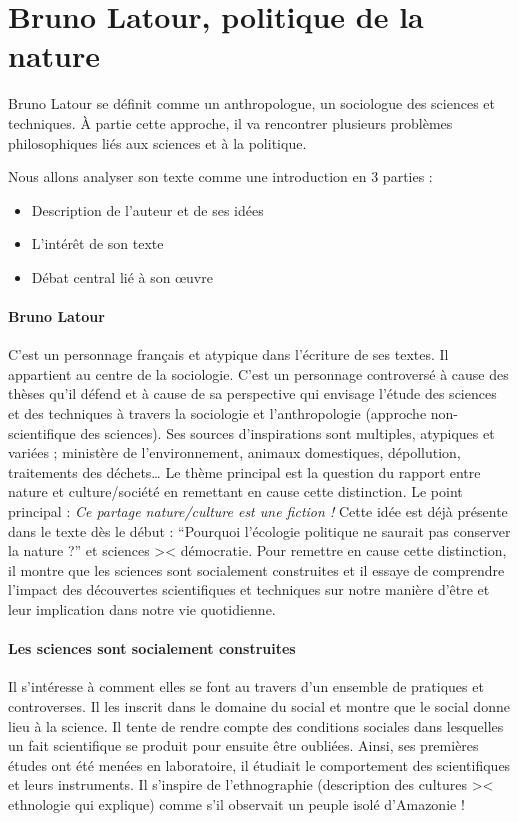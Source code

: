 \documentclass[11pt,a4paper]{article} %
\begin{document}
\part{Bruno Latour, politique de la nature}
Bruno Latour se définit comme un anthropologue, un sociologue des sciences et techniques.
À partie cette approche, il va rencontrer plusieurs problèmes philosophiques liés aux sciences et à la politique.

Nous allons analyser son texte comme une introduction en 3 parties :
\begin{itemize}
	\item Description de l'auteur et de ses idées
	\item L'intérêt de son texte
	\item Débat central lié à son œuvre
\end{itemize}

\subsection{Bruno Latour}
C'est un personnage français et atypique dans l'écriture de ses textes.
Il appartient au centre de la sociologie.
C'est un personnage controversé à cause des thèses qu'il défend et à cause de sa perspective qui envisage l'étude des sciences et des techniques à travers la sociologie et l'anthropologie (approche non-scientifique des sciences).
Ses sources d'inspirations sont multiples, atypiques et variées ; ministère de l'environnement, animaux domestiques, dépollution, traitements des déchets… Le thème principal est la question du rapport entre nature et culture/société en remettant en cause cette distinction.
Le point principal : \emph{Ce partage nature/culture est une fiction !} Cette idée est déjà présente dans le texte dès le début :  ``Pourquoi l'écologie politique ne saurait pas conserver la nature ?'' et sciences >< démocratie.
Pour remettre en cause cette distinction, il montre que les sciences sont socialement construites et il essaye de comprendre l'impact des découvertes scientifiques et techniques sur notre manière d'être et leur implication dans notre vie quotidienne.

\subsection{Les sciences sont socialement construites}
Il s'intéresse à comment elles se font au travers d'un ensemble de pratiques et controverses.
Il les inscrit dans le domaine du social et montre que le social donne lieu à la science.
Il tente de rendre compte des conditions sociales dans lesquelles un fait scientifique se produit pour ensuite être oubliées.
Ainsi, ses premières études ont été menées en laboratoire, il étudiait le comportement des scientifiques et leurs instruments.
Il s'inspire de l'ethnographie (description des cultures >< ethnologie qui explique) comme s'il observait un peuple isolé d'Amazonie !
\end{document}
